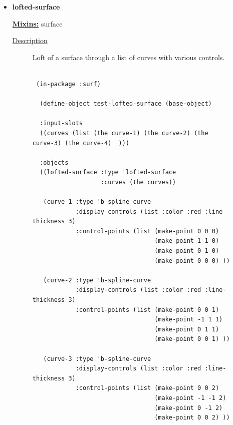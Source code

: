 \documentclass [11pt]{book}
\begin{document}
\begin{itemize}
\item {}
\label{prim:lofted-surface}
\textbf{lofted-surface}


\textbf{
\underline{Mixins:}} surface





\begin{description}

\item [
\underline{Description}]


Loft of a surface through a list of curves with
various controls. 



\end{description}




\begin{figure}
\begin{lrbox}{\boxedverb}
\begin{minipage}{\linewidth}
{\small

\begin{verbatim}
                  
 (in-package :surf)

  (define-object test-lofted-surface (base-object)
  
  :input-slots
  ((curves (list (the curve-1) (the curve-2) (the curve-3) (the curve-4)  )))
  
  :objects
  ((lofted-surface :type 'lofted-surface
                   :curves (the curves))
   
   (curve-1 :type 'b-spline-curve
            :display-controls (list :color :red :line-thickness 3)
            :control-points (list (make-point 0 0 0)
                                  (make-point 1 1 0)
                                  (make-point 0 1 0)
                                  (make-point 0 0 0) ))
   
   (curve-2 :type 'b-spline-curve
            :display-controls (list :color :red :line-thickness 3)
            :control-points (list (make-point 0 0 1)
                                  (make-point -1 1 1)
                                  (make-point 0 1 1)
                                  (make-point 0 0 1) ))
           
   (curve-3 :type 'b-spline-curve
            :display-controls (list :color :red :line-thickness 3)
            :control-points (list (make-point 0 0 2)
                                  (make-point -1 -1 2)
                                  (make-point 0 -1 2)
                                  (make-point 0 0 2) ))
   

\end{verbatim}}
\end{minipage}
\end{lrbox}
\end{figure}
\end{itemize}
\end{document}
